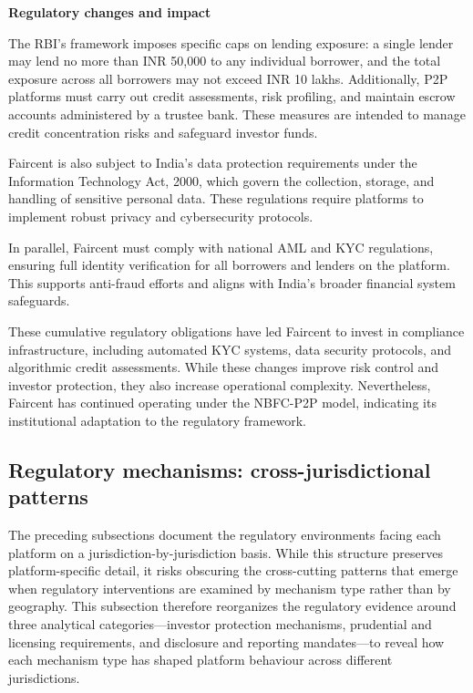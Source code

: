 \documentclass[pdflatex,sn-apa]{sn-jnl}%
\theoremstyle{thmstyleone}%
\theoremstyle{thmstyletwo}%
\theoremstyle{thmstylethree}%
\begin{document}
\textbf{Regulatory changes and impact}

The RBI’s framework imposes specific caps on lending exposure: a single lender may lend no more than INR 50,000 to any individual borrower, and the total exposure across all borrowers may not exceed INR 10 lakhs. Additionally, P2P platforms must carry out credit assessments, risk profiling, and maintain escrow accounts administered by a trustee bank. These measures are intended to manage credit concentration risks and safeguard investor funds.

Faircent is also subject to India's data protection requirements under the Information Technology Act, 2000, which govern the collection, storage, and handling of sensitive personal data. These regulations require platforms to implement robust privacy and cybersecurity protocols.

In parallel, Faircent must comply with national AML and KYC regulations, ensuring full identity verification for all borrowers and lenders on the platform. This supports anti-fraud efforts and aligns with India’s broader financial system safeguards.

These cumulative regulatory obligations have led Faircent to invest in compliance infrastructure, including automated KYC systems, data security protocols, and algorithmic credit assessments. While these changes improve risk control and investor protection, they also increase operational complexity. Nevertheless, Faircent has continued operating under the NBFC-P2P model, indicating its institutional adaptation to the regulatory framework.

\subsection{Regulatory mechanisms: cross-jurisdictional patterns}\label{sec:reg_mechanisms}

\textcolor{NavyBlue}{The preceding subsections document the regulatory environments facing each platform on a jurisdiction-by-jurisdiction basis. While this structure preserves platform-specific detail, it risks obscuring the cross-cutting patterns that emerge when regulatory interventions are examined by mechanism type rather than by geography. This subsection therefore reorganizes the regulatory evidence around three analytical categories—investor protection mechanisms, prudential and licensing requirements, and disclosure and reporting mandates—to reveal how each mechanism type has shaped platform behaviour across different jurisdictions.}
\end{document}
